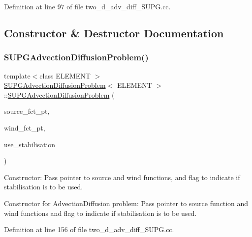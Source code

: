 Definition at line 97 of file two\+\_\+d\+\_\+adv\+\_\+diff\+\_\+\+S\+U\+P\+G.\+cc.



\subsection{Constructor \& Destructor Documentation}
\mbox{\label{classSUPGAdvectionDiffusionProblem_a95aa4192c1b42327b12cdbb75295d192}} 
\subsubsection{\texorpdfstring{S\+U\+P\+G\+Advection\+Diffusion\+Problem()}{SUPGAdvectionDiffusionProblem()}}
{\footnotesize\ttfamily template$<$class E\+L\+E\+M\+E\+NT $>$ \\
\hyperlink{classSUPGAdvectionDiffusionProblem}{S\+U\+P\+G\+Advection\+Diffusion\+Problem}$<$ E\+L\+E\+M\+E\+NT $>$\+::\hyperlink{classSUPGAdvectionDiffusionProblem}{S\+U\+P\+G\+Advection\+Diffusion\+Problem} (\begin{DoxyParamCaption}\item[{Advection\+Diffusion\+Equations$<$ 2 $>$\+::Advection\+Diffusion\+Source\+Fct\+Pt}]{source\+\_\+fct\+\_\+pt,  }\item[{Advection\+Diffusion\+Equations$<$ 2 $>$\+::Advection\+Diffusion\+Wind\+Fct\+Pt}]{wind\+\_\+fct\+\_\+pt,  }\item[{const bool \&}]{use\+\_\+stabilisation }\end{DoxyParamCaption})}



Constructor\+: Pass pointer to source and wind functions, and flag to indicate if stabilisation is to be used. 

Constructor for Advection\+Diffusion problem\+: Pass pointer to source function and wind functions and flag to indicate if stabilisation is to be used. 

Definition at line 156 of file two\+\_\+d\+\_\+adv\+\_\+diff\+\_\+\+S\+U\+P\+G.\+cc.



